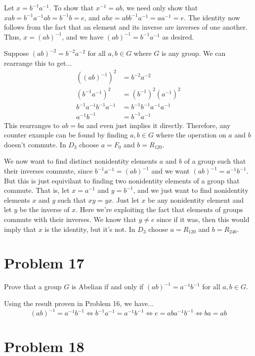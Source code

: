 \documentclass{article}
\begin{document}
Let $x=b^{-1}a^{-1}$.  To show that $x^{-1}=ab$, we need only show that
$xab=b^{-1}a^{-1}ab = b^{-1}b = e$, and $abx=abb^{-1}a^{-1}=aa^{-1}=e$.
The identity now follows from the fact that an element and its inverse are inverses
of one another.  Thus, $x=(ab)^{-1}$, and we have $(ab)^{-1}=b^{-1}a^{-1}$ as desired.

Suppose $(ab)^{-2}=b^{-2}a^{-2}$ for all $a,b\in G$ where $G$ is any group.  We can rearrange this
to get...
\begin{align*}
((ab)^{-1})^2 &= b^{-2}a^{-2} \\
(b^{-1}a^{-1})^2 &= (b^{-1})^2(a^{-1})^2 \\
b^{-1}a^{-1}b^{-1}a^{-1} &= b^{-1}b^{-1}a^{-1}a^{-1} \\
a^{-1}b^{-1} &= b^{-1}a^{-1}
\end{align*}
This rearranges to $ab=ba$ and even just implies it directly.
Therefore, any counter example can be found by finding
$a,b\in G$ where the operation on $a$ and $b$ doesn't commute.  In $D_3$ choose
$a=F_0$ and $b=R_{120}$.

We now want to find distinct nonidentity elements $a$ and $b$ of a group such that their inverses commute,
since $b^{-1}a^{-1}=(ab)^{-1}$ and we want $(ab)^{-1}=a^{-1}b^{-1}$.  But this is just equivilant
to finding two nonidentity elements of a group that commute.  That is, let $x=a^{-1}$ and $y=b^{-1}$,
and we just want to find nonidentity elements $x$ and $y$ such that $xy=yx$.  Just let $x$ be any nonidentity
element and let $y$ be the inverse of $x$.  Here we're exploiting the fact that elements of groups commute
with their inverses.  We know that $y\neq e$ since if it was, then this would imply that $x$ is the identity, but
it's not.  In $D_3$ choose $a=R_{120}$ and $b=R_{240}$.

\section*{Problem 17}

Prove that a group $G$ is Abelian if and only if $(ab)^{-1}=a^{-1}b^{-1}$ for all $a,b\in G$.

Using the result proven in Problem 16, we have...
\begin{equation*}
(ab)^{-1} = a^{-1}b^{-1} \Longleftrightarrow b^{-1}a^{-1} = a^{-1}b^{-1}
\Longleftrightarrow e = aba^{-1}b^{-1} \Longleftrightarrow ba = ab
\end{equation*}

\section*{Problem 18}
\end{document}
